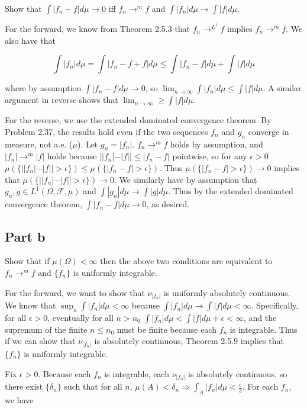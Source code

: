 \documentclass{article}
\newcommand{\F}{\mathcal{F}}
\begin{document}
Show that $\int|f_n - f|d \mu \rightarrow 0$ iff $f_n \rightarrow^m f$ and $\int |f_n|d \mu \rightarrow \int |f|d \mu$.

For the forward, we know from Theorem 2.5.3 that $f_n \rightarrow^{L^1} f$ implies $f_n \rightarrow^m f$. We also have that

\[
\int|f_n|d\mu = \int|f_n - f + f|d\mu \leq \int|f_n-f|d\mu + \int|f|d\mu
\]

where by assumption $\int|f_n-f|d\mu \rightarrow 0$, so $\lim_{n \rightarrow \infty} \int|f_n|d\mu \leq \int|f|d\mu$. A similar argument in reverse shows that $\lim_{n \rightarrow \infty} \geq \int|f|d\mu$.

For the reverse, we use the extended dominated convergence theorem. By Problem 2.37, the results hold even if the two sequences $f_n$ and $g_n$ converge in measure, not a.e. ($\mu$). Let $g_n = |f_n|$. $f_n \rightarrow^m f$ holds by assumption, and $|f_n| \rightarrow^m |f|$ holds because $||f_n| - |f|| \leq |f_n - f|$ pointwise, so for any $\epsilon > 0$ $\mu(\{||f_n| - |f|| > \epsilon\}) \leq \mu(\{|f_n - f| > \epsilon\})$. Thus $\mu(\{|f_n - f| > \epsilon\}) \rightarrow 0$ implies that $\mu(\{||f_n| - |f|| > \epsilon\}) \rightarrow 0$. We similarly have by assumption that $g_n, g \in L^1(\Omega, \F, \mu)$ and $\int |g_n|d\mu \rightarrow \int|g|d\mu$. Thus by the extended dominated convergence theorem, $\int|f_n-f|d\mu \rightarrow 0$, as desired.

\subsection*{Part b}

Show that if $\mu(\Omega) < \infty$ then the above two conditions are equivalent to $f_n \rightarrow^m f$ and $\{f_n\}$ is uniformly integrable.

For the forward, we want to show that $\nu_{|f_n|}$ is uniformly absolutely continuous. We know that $\sup_n \int|f_n|d\mu < \infty$ because $\int |f_n|d\mu \rightarrow \int|f|d\mu < \infty$. Specifically, for all $\epsilon > 0$, eventually for all $n > n_0$ $\int |f_n|d\mu < \int|f|d\mu + \epsilon < \infty$, and the supremum of the finite $n \leq n_0$ must be finite because each $f_n$ is integrable. Thus if we can show that $\nu_{|f_n|}$ is absolutely continuous, Theorem 2.5.9 implies that $\{f_n\}$ is uniformly integrable.

Fix $\epsilon > 0$. Because each $f_n$ is integrable, each $\nu_{|f_n|}$ is absolutely continuous, so there exist $\{\delta_n\}$ such that for all $n$, $\mu(A) < \delta_n \Rightarrow \int_A|f_n|d\mu < \frac{\epsilon}{3}$. For each $f_n$, we have
\end{document}
